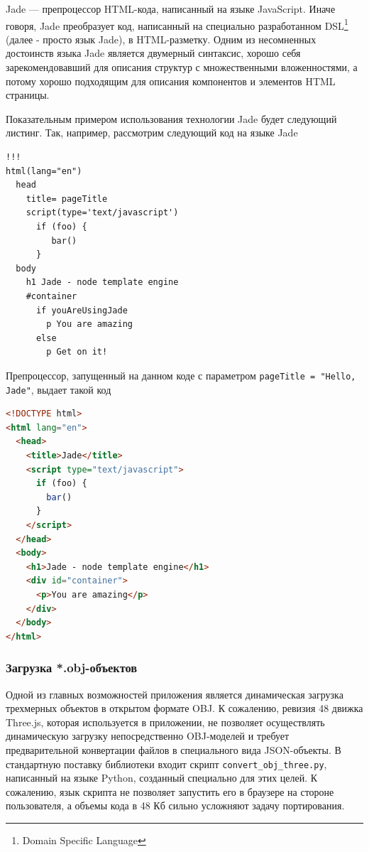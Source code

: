 \documentclass[12pt, a4paper]{article}
\begin{document}
Jade --- препроцессор HTML-кода, написанный на языке JavaScript. Иначе говоря,
Jade преобразует код, написанный на специально разработанном DSL\footnote{Domain
Specific Language} (далее - просто язык Jade), в HTML-разметку. Одним из
несомненных достоинств языка Jade является двумерный синтаксис, хорошо себя
зарекомендовавший для описания структур с множественными вложенностями, а потому
хорошо подходящим для описания компонентов и элементов HTML страницы.

Показательным примером использования технологии Jade будет следующий листинг.
Так, например, рассмотрим следующий код на языке Jade
\begin{lstlisting}
!!!
html(lang="en")
  head
    title= pageTitle
    script(type='text/javascript')
      if (foo) {
         bar()
      }
  body
    h1 Jade - node template engine
    #container
      if youAreUsingJade
        p You are amazing
      else
        p Get on it!
\end{lstlisting}

Препроцессор, запущенный на данном коде с параметром \texttt{pageTitle = "Hello,
Jade"}, выдает такой код

\begin{lstlisting}[language=html]
<!DOCTYPE html>
<html lang="en">
  <head>
    <title>Jade</title>
    <script type="text/javascript">
      if (foo) {
        bar()
      }
    </script>
  </head>
  <body>
    <h1>Jade - node template engine</h1>
    <div id="container">
      <p>You are amazing</p>
    </div>
  </body>
</html>
\end{lstlisting}

\subsubsection{Загрузка *.obj-объектов}
Одной из главных возможностей приложения является динамическая загрузка
трехмерных объектов в открытом формате OBJ. К сожалению, ревизия 48 движка
Three.js, которая используется в приложении, не позволяет осуществлять
динамическую загрузку непосредственно OBJ-моделей и требует предварительной
конвертации файлов в специального вида JSON-объекты. В стандартную поставку
библиотеки входит скрипт \texttt{convert\_obj\_three.py}, написанный на языке
Python, созданный специально для этих целей. К сожалению, язык
скрипта не позволяет запустить его в браузере на стороне пользователя, а объемы кода в 48 Кб сильно
усложняют задачу портирования.
\end{document}

